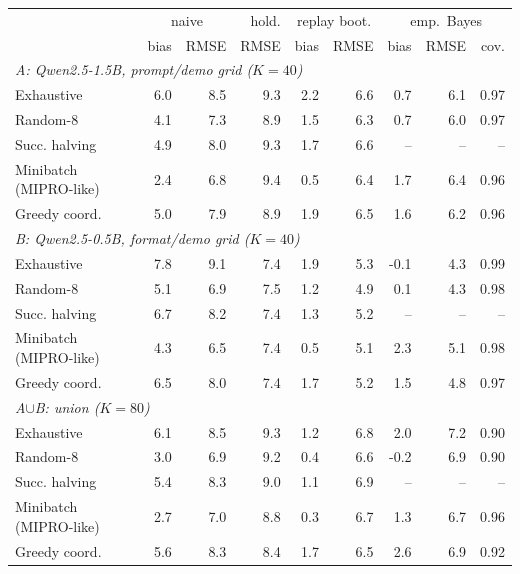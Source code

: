 \begin{tabular}{lrrrrrrrr}\toprule
\multicolumn{1}{l}{} & \multicolumn{2}{c}{naive} & hold. & \multicolumn{2}{c}{replay boot.} & \multicolumn{3}{c}{emp.\ Bayes} \\
 & bias & RMSE & RMSE & bias & RMSE & bias & RMSE & cov. \\\midrule
\multicolumn{9}{l}{\emph{A: Qwen2.5-1.5B, prompt/demo grid ($K{=}40$)}} \\
Exhaustive & 6.0 & 8.5 & 9.3 & 2.2 & 6.6 & 0.7 & 6.1 & 0.97 \\
Random-8 & 4.1 & 7.3 & 8.9 & 1.5 & 6.3 & 0.7 & 6.0 & 0.97 \\
Succ. halving & 4.9 & 8.0 & 9.3 & 1.7 & 6.6 & -- & -- & -- \\
Minibatch (MIPRO-like) & 2.4 & 6.8 & 9.4 & 0.5 & 6.4 & 1.7 & 6.4 & 0.96 \\
Greedy coord. & 5.0 & 7.9 & 8.9 & 1.9 & 6.5 & 1.6 & 6.2 & 0.96 \\
\multicolumn{9}{l}{\emph{B: Qwen2.5-0.5B, format/demo grid ($K{=}40$)}} \\
Exhaustive & 7.8 & 9.1 & 7.4 & 1.9 & 5.3 & -0.1 & 4.3 & 0.99 \\
Random-8 & 5.1 & 6.9 & 7.5 & 1.2 & 4.9 & 0.1 & 4.3 & 0.98 \\
Succ. halving & 6.7 & 8.2 & 7.4 & 1.3 & 5.2 & -- & -- & -- \\
Minibatch (MIPRO-like) & 4.3 & 6.5 & 7.4 & 0.5 & 5.1 & 2.3 & 5.1 & 0.98 \\
Greedy coord. & 6.5 & 8.0 & 7.4 & 1.7 & 5.2 & 1.5 & 4.8 & 0.97 \\
\multicolumn{9}{l}{\emph{A$\cup$B: union ($K{=}80$)}} \\
Exhaustive & 6.1 & 8.5 & 9.3 & 1.2 & 6.8 & 2.0 & 7.2 & 0.90 \\
Random-8 & 3.0 & 6.9 & 9.2 & 0.4 & 6.6 & -0.2 & 6.9 & 0.90 \\
Succ. halving & 5.4 & 8.3 & 9.0 & 1.1 & 6.9 & -- & -- & -- \\
Minibatch (MIPRO-like) & 2.7 & 7.0 & 8.8 & 0.3 & 6.7 & 1.3 & 6.7 & 0.96 \\
Greedy coord. & 5.6 & 8.3 & 8.4 & 1.7 & 6.5 & 2.6 & 6.9 & 0.92 \\
\bottomrule
\end{tabular}
